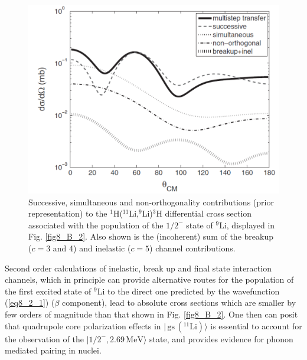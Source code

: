  \begin{figure}
 	\centerline{\includegraphics*[width=12cm,angle=0]{C8/figsC8/fig8_B_3}}
 	\caption{Successive, simultaneous and non-orthogonality contributions (prior representation)
 		to the  $^1$H($^{11}$Li,$^9$Li)$^3$H differential cross section
 		associated with the population of the $1/2^-$ state
 		of $^9$Li, displayed in Fig. \ref{fig8_B_2}. Also shown is the (incoherent) sum of the breakup ($c=3$ and 4) and inelastic ($c=5$) channel contributions.}\label{fig8_B_3}
 \end{figure}
 
 Second order calculations of inelastic, break up and final state interaction channels, which in principle can provide alternative routes for the population of the first excited state of $^9$Li  to the direct one predicted by the wavefunction (\ref{eq8_2_1})  ($\beta$ component), lead to absolute cross sections which are smaller by few orders of magnitude than that shown in Fig. \ref{fig8_B_2}. One then can posit that quadrupole core polarization effects in $|\,\text{gs}\,(^{11}\text{Li})\rangle$ is essential to account for the observation of the $|1/2^-,2.69\,\text{MeV}\rangle$ state, and provides evidence for phonon mediated pairing in nuclei. 


